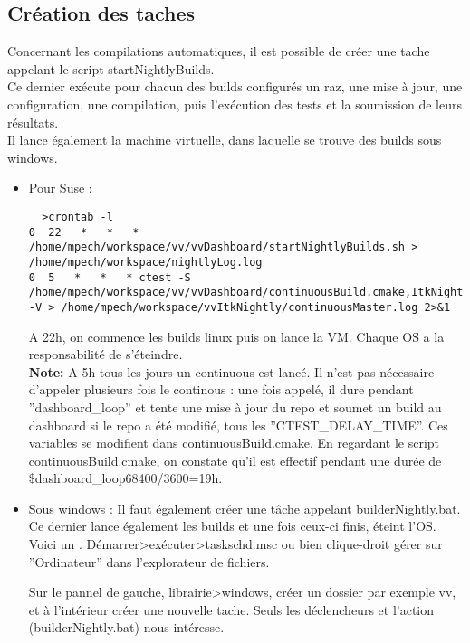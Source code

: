 \documentclass[12pt]{report}
\newenvironment{note}{\textbf{Note:}}{}
\begin{document}
\subsection{Création des taches}
Concernant les compilations automatiques, il est possible de créer une tache appelant le script startNightlyBuilds. \\
Ce dernier exécute pour chacun des builds configurés un raz, une mise à jour, une configuration, une compilation, puis l'exécution des tests et la
soumission de leurs résultats.\\
Il lance également la machine virtuelle, dans laquelle se trouve des builds sous windows.
\begin{itemize}
\item Pour Suse : 
\begin{verbatim}
  >crontab -l
0  22   *   *   * /home/mpech/workspace/vv/vvDashboard/startNightlyBuilds.sh > /home/mpech/workspace/nightlyLog.log
0  5   *   *   * ctest -S /home/mpech/workspace/vv/vvDashboard/continuousBuild.cmake,ItkNightly -V > /home/mpech/workspace/vvItkNightly/continuousMaster.log 2>&1
\end{verbatim}
A 22h, on commence les builds linux puis on lance la VM. Chaque OS a la responsabilité de s'éteindre.\\
\begin{note}
A 5h tous les jours un continuous est lancé. Il n'est pas nécessaire d'appeler plusieurs fois le continous : 
une fois appelé, il dure pendant ''dashboard\_loop'' et tente une mise à jour du repo et soumet un build
au dashboard si le repo a été modifié, tous les ''CTEST\_DELAY\_TIME''. Ces variables
se modifient dans continuousBuild.cmake.
En regardant le script continuousBuild.cmake, on constate qu'il est effectif pendant une durée de \${dashboard\_loop}68400/3600=19h.
\end{note}
\item Sous windows :
Il faut également créer une tâche appelant builderNightly.bat. Ce dernier lance également les builds et une fois ceux-ci finis,
éteint l'OS.
Voici un .
Démarrer>exécuter>taskschd.msc ou bien clique-droit gérer sur ''Ordinateur'' dans l'explorateur de fichiers.

Sur le pannel de gauche, librairie>windows, créer un dossier par exemple vv, et à l'intérieur créer une nouvelle tache.
Seuls les déclencheurs et l'action (builderNightly.bat) nous intéresse.
\end{itemize}
\end{document}

